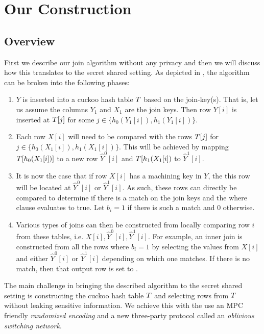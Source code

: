 \section{Our Construction}\label{sec:construction}



\subsection{Overview}
First we describe our join algorithm without any privacy and then we will discuss how this translates to the secret shared setting. As depicted in , the algorithm can be broken into the following phases:
\begin{enumerate}
	\item \label{step:overview1}  $Y$ is inserted into a cuckoo hash table $T$ based on the join-key(s). That is, let us assume the columns $Y_1$ and $X_1$ are the join keys. Then 
	row $Y[i]$ is inserted at $T[j]$ for some $j\in \{h_0(Y_1[i]), h_1(Y_1[i])\}$.
	\item \label{step:overview2} Each row $X[i]$ will need to be compared with the rows $T[j]$ for $j\in \{h_0(X_1[i]), h_1(X_1[i])\}$. This will be achieved by mapping $T[h_0(X_1[i])]$ to a new row $\widehat{Y}^0[i]$ and $T[h_1(X_1[i])$ to $\widehat{Y}^1[i]$. 
	\item \label{step:overview3} It is now the case that if row $X[i]$ has a machining key in $Y$, the this row will be located at $\widehat{Y}^0[i]$ or $\widehat{Y}^1[i]$. As such, these rows can directly be compared to determine if there is a match on the join keys and the where clause evaluates to true. Let $b_i=1$ if there is such a match and $0$ otherwise.
	\item \label{step:overview4} Various types of joins can then be constructed from locally comparing row $i$ from these tables, i.e. $X[i],\widehat{Y}^0[i], \widehat{Y}^1[i]$. For example, an inner join is constructed from all the rows where $b_i=1$ by selecting the values from $X[i]$ and either $\widehat{Y}^0[i]$ or $\widehat{Y}^1[i]$ depending on which one matches. If there is no match, then that output row is set to \Null.
\end{enumerate} 

The main challenge in bringing the described algorithm to the secret shared setting is constructing the cuckoo hash table $T$ and selecting rows from $T$ without leaking sensitive information. We achieve this with the use an MPC friendly \emph{randomized encoding} and a new three-party protocol called an \emph{oblivious switching network}.


